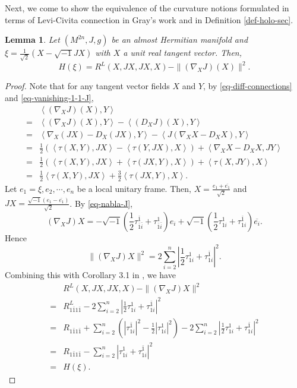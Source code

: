 \documentclass[12pt]{amsart}
\def\ol{\overline}
\def\ol{\overline}
\def\ii{{\sqrt{-1}}}
\def\vv<#1,#2>{\left\langle#1,#2\right\rangle}
\newtheorem{lem}{Lemma}[section]
\theoremstyle{definition}
\theoremstyle{remark}
\numberwithin{equation}{section}
\def\bi{{\bar i}}
\begin{document}
Next, we come to show the equivalence of the curvature notions formulated in terms of Levi-Civita connection in Gray's work \cite{Gray} and in Definition \ref{def-holo-sec}.
\begin{lem}\label{lem-curv-holo-sec}
Let $(M^{2n},J,g)$ be an almost Hermitian manifold and $\xi=\frac{1}{\sqrt2}(X-\ii JX)$ with $X$ a unit real tangent vector. Then,
\begin{equation}
H(\xi)=R^L(X,JX,JX,X)-\|(\nabla_XJ)(X)\|^2.
\end{equation}
\end{lem}
\begin{proof}
Note that for any tangent vector fields $X$ and $Y$, by \eqref{eq-diff-connections} and \eqref{eq-vanishing-1-1-J},
\begin{equation}\label{eq-nabla-J}
\begin{split}
&\vv<(\nabla_XJ)(X),Y>\\
=&\vv<(\nabla_XJ)(X),Y>-\vv<(D_XJ)(X),Y>\\
=&\vv<\nabla_X(JX)-D_X(JX),Y>-\vv<J(\nabla_XX-D_XX),Y>\\
=&\frac{1}{2}(\vv<\tau(X,Y),JX>-\vv<\tau(Y,JX),X>)+\vv<\nabla_XX-D_XX,JY>\\
=&\frac{1}{2}(\vv<\tau(X,Y),JX>+\vv<\tau(JX,Y),X>)+\vv<\tau(X,JY),X>\\
=&\frac{1}{2}\vv<\tau(X,Y),JX>+\frac32\vv<\tau(JX,Y),X>.
\end{split}
\end{equation}
Let $e_1=\xi,e_2,\cdots,e_n$ be a local unitary frame. Then, $X=\frac{e_1+\ol{e_1}}{\sqrt 2}$ and $JX=\frac{\ii(e_1-\ol{e_1})}{\sqrt 2}$. By \eqref{eq-nabla-J},
\begin{equation}
(\nabla_XJ)X=-\ii\left(\frac12\tau_{\bar 1\bi}^{\bar 1}+\tau_{\bar 1\bi}^{ 1}\right)e_i+\ii\left(\frac12\tau_{ 1i}^{ 1}+\tau_{1i}^{\bar 1}\right)\ol{e_i}.
\end{equation}
Hence
\begin{equation}
\|(\nabla_XJ)X\|^2=2\sum_{i=2}^n\left|\frac12\tau_{ 1i}^{ 1}+\tau_{1i}^{\bar 1}\right|^2.
\end{equation}
Combining this with  Corollary 3.1 in \cite{Yu1}, we have
\begin{equation}
\begin{split}
&R^L(X,JX,JX,X)-\|(\nabla_XJ)X\|^2\\
=&R^L_{1\bar 11\bar 1}-2\sum_{i=2}^n\left|\frac12\tau_{ 1i}^{ 1}+\tau_{1i}^{\bar 1}\right|^2\\
=&R_{1\bar 1 1\bar 1}+\sum_{i=2}^n\left(|\tau_{1i}^{\bar 1}|^2-\frac{1}{2}|\tau_{1i}^1|^2\right)-2\sum_{i=2}^n\left|\frac12\tau_{ 1i}^{ 1}+\tau_{1i}^{\bar 1}\right|^2\\
=&R_{1\bar 11\bar 1}-\sum_{i=2}^n\left|\tau_{ 1i}^{ 1}+\tau_{1i}^{\bar 1}\right|^2\\
=&H(\xi).
\end{split}
\end{equation}
\end{proof}
\end{document}
